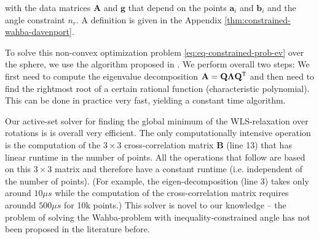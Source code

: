 with the data matrices $\mathbf{A}$ and $\mathbf{g}$ that depend on the points $\mathbf{a}_i$ and $\mathbf{b}_i$ and the angle constraint $n_r$. A definition is given in the Appendix \ref{thm:constrained-wahba-davenport}.

To solve this non-convex optimization problem \ref{eq:eq-constrained-prob-ev} over the sphere, we use the algorithm proposed in \cite{10.1007/978-3-642-75536-1_57}. We perform overall two steps: We first need to compute the eigenvalue decomposition  $\mathbf{A} = \mathbf{Q}\mathbf{\Lambda}\mathbf{Q}^{\mathsf{T}}$ and then need to find the rightmost root of a certain rational function (characteristic polynomial). This can be done in practice very fast, yielding a constant time algorithm.


Our active-set solver for finding the global minimum of the WLS-relaxation over rotations is is overall very efficient. The only computationally intensive operation is the computation of the $3 \times 3$ cross-correlation matrix $\mathbf{B}$ (line 13) that has linear runtime in the number of points. All the operations that follow are based on this $3 \times 3$ matrix and therefore have a constant runtime (i.e. independent of the number of points). (For example, the eigen-decomposition (line 3) takes only around $10 \mu s$ while the computation of the cross-correlation matrix requires aroundd $500 \mu s$ for 10k points.)
This solver is novel to our knowledge -- the problem of solving the Wahba-problem with inequality-constrained angle has not been proposed in the literature before.
